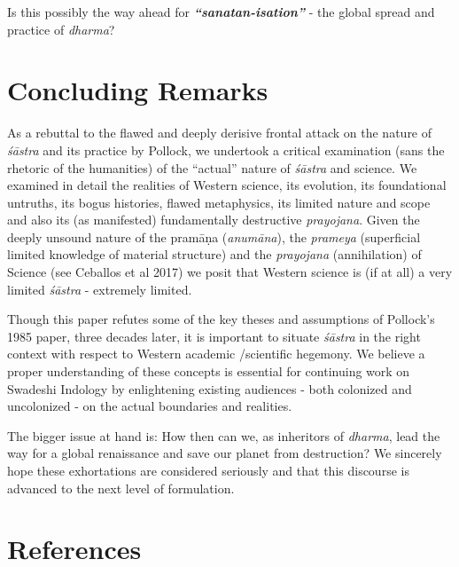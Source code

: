 Is this possibly the way ahead for \textbf{\textit{“sanatan-isation”}} - the global spread and practice of \textit{dharma}?


\section*{Concluding Remarks}

As a rebuttal to the flawed and deeply derisive frontal attack on the nature of \textit{śāstra} and its practice by Pollock, we undertook a critical examination (sans the rhetoric of the humanities) of the “actual” nature of \textit{śāstra} and science. We examined in detail the realities of Western science, its evolution, its foundational untruths, its bogus histories, flawed metaphysics, its limited nature and scope and also its (as manifested) fundamentally destructive \textit{prayojana}. Given the deeply unsound nature of the pramāṇa (\textit{anumāna}), the \textit{prameya} (superficial limited knowledge of material structure) and the \textit{prayojana} (annihilation) of Science (see Ceballos et al 2017) we posit that Western science is (if at all) a very limited \textit{śāstra} - extremely limited.

Though this paper refutes some of the key theses and assumptions of Pollock’s 1985 paper, three decades later, it is important to situate \textit{śāstra} in the right context with respect to Western academic /scientific hegemony. We believe a proper understanding of these concepts is essential for continuing work on Swadeshi Indology by enlightening existing audiences - both colonized and uncolonized - on the actual boundaries and realities.

The bigger issue at hand is: How then can we, as inheritors of \textit{dharma}, lead the way for a global renaissance and save our planet from destruction? We sincerely hope these exhortations are considered seriously and that this discourse is advanced to the next level of formulation.

\newpage


\section*{References}

